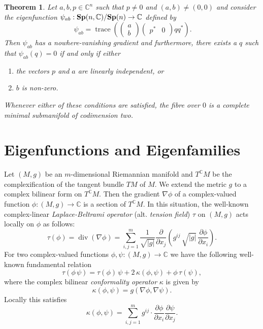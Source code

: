 \documentclass[11pt,reqno]{amsart}
\theoremstyle{plain}
\newtheorem{theorem}                 {Theorem}[section]
\theoremstyle{definition}
\numberwithin{equation}{section}
\def \cn{{\mathbb C}}
\def \Sp#1{\text{\bf Sp}(#1)}
\def \SpC#1{\text{\bf Sp}(#1,\cn)}
\DeclareMathOperator{\Div}{div}
\DeclareMathOperator{\trace}{trace}
\numberwithin{equation}{section}
\begin{document}
	\begin{theorem} \label{thm-Sp-minimal}
	Let $a,b,p \in \cn^n$ such that $p \neq 0$ and $(a,b) \neq (0,0)$ and consider the eigenfunction $\psi_{ab}:\SpC{n}/\Sp{n} \to \cn$ defined by $$ \ \psi_{ab} = \trace\left( \begin{pmatrix}
	a \\ b
\end{pmatrix} \begin{pmatrix}
p^* & 0
\end{pmatrix}  q q^*\right).$$
Then $\psi_{ab}$ has a nowhere-vanishing gradient and furthermore, there exists a $q$ such that
$\psi_{ab}(q)=0$
if and only if either
\begin{enumerate}
	\item the vectors $p$ and $a$ are linearly independent, or
	\item $b$ is non-zero.
\end{enumerate}
 Whenever either of these conditions are satisfied, the fibre over $0$ is a complete minimal submanifold of codimension two.
\end{theorem}
	
	
\section{Eigenfunctions and Eigenfamilies}
Let $(M,g)$ be an $m$-dimensional Riemannian manifold and $T^{\cn}M$ be the complexification of the tangent bundle $TM$ of $M$. We extend the metric $g$ to a complex bilinear form on $T^{\cn}M$.  Then the gradient $\nabla\phi$ of a complex-valued function $\phi:(M,g)\to\cn$ is a section of $T^{\cn}M$.  In this situation, the well-known complex-linear {\it Laplace-Beltrami operator} (alt. {\it tension field}) $\tau$ on $(M,g)$ acts locally on $\phi$ as follows:
$$
\tau(\phi)=\Div (\nabla \phi)=\sum_{i,j=1}^m\frac{1}{\sqrt{|g|}} \frac{\partial}{\partial x_j}
\left(g^{ij}\, \sqrt{|g|}\, \frac{\partial \phi}{\partial x_i}\right).
$$
For two complex-valued functions $\phi,\psi:(M,g)\to\cn$ we have the following well-known fundamental relation
\begin{equation*}\label{equation-basic}
\tau(\phi\, \psi)=\tau(\phi)\,\psi +2\,\kappa(\phi,\psi)+\phi\,\tau(\psi),
\end{equation*}
where the complex bilinear {\it conformality operator} $\kappa$ is given by $$\kappa(\phi,\psi)=g(\nabla \phi,\nabla \psi).$$  Locally this satisfies 
$$\kappa(\phi,\psi)=\sum_{i,j=1}^mg^{ij}\cdot\frac{\partial\phi}{\partial x_i}\frac{\partial \psi}{\partial x_j}.$$
\end{document}
